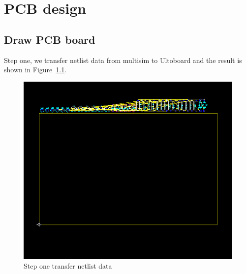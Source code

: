 \chapter{PCB design}  

\section{Draw PCB board}

Step one, we transfer netlist data from multisim to Ultoboard and the result is shown in Figure~\ref{fig:Step one transfer netlist datas}. 

\begin{figure}[htbp]
	\centering
	\includegraphics[scale=0.6]{"../Photo/Chap6/first_inport_netlist"}
	\caption{Step one transfer netlist data}
	\label{fig:Step one transfer netlist datas}
\end{figure}


